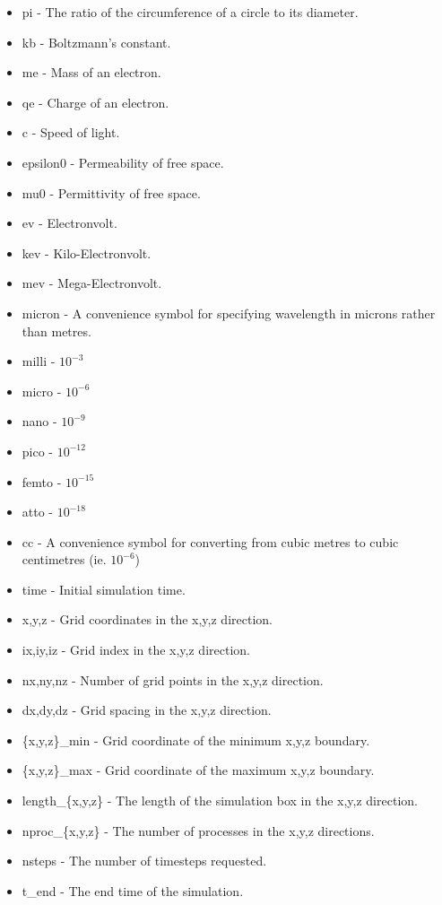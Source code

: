 \begin{itemize}
\item pi - The ratio of the circumference of a circle to its diameter.
\item kb - Boltzmann's constant.
\item me - Mass of an electron.
\item qe - Charge of an electron.
\item c - Speed of light.
\item epsilon0 - Permeability of free space.
\item mu0 - Permittivity of free space.
\item ev - Electronvolt.
\item kev - Kilo-Electronvolt.
\item mev - Mega-Electronvolt.
\item micron - A convenience symbol for specifying wavelength in microns
  rather than metres.
\item milli - $10^{-3}$
\item micro - $10^{-6}$
\item nano - $10^{-9}$
\item pico - $10^{-12}$
\item femto - $10^{-15}$
\item atto - $10^{-18}$
\item cc - A convenience symbol for converting from cubic metres to cubic
  centimetres (ie. $10^{-6}$)
\item time - Initial simulation time.
\item x,y,z - Grid coordinates in the x,y,z direction.
\item ix,iy,iz - Grid index in the x,y,z direction.
\item nx,ny,nz - Number of grid points in the x,y,z direction.
\item dx,dy,dz - Grid spacing in the x,y,z direction.
\item \{x,y,z\}\_min - Grid coordinate of the minimum x,y,z boundary.
\item \{x,y,z\}\_max - Grid coordinate of the maximum x,y,z boundary.
\item length\_\{x,y,z\} - The length of the simulation box in the x,y,z
  direction.
\item nproc\_\{x,y,z\} - The number of processes in the x,y,z directions.
\item nsteps - The number of timesteps requested.
\item t\_end - The end time of the simulation.
\end{itemize}

